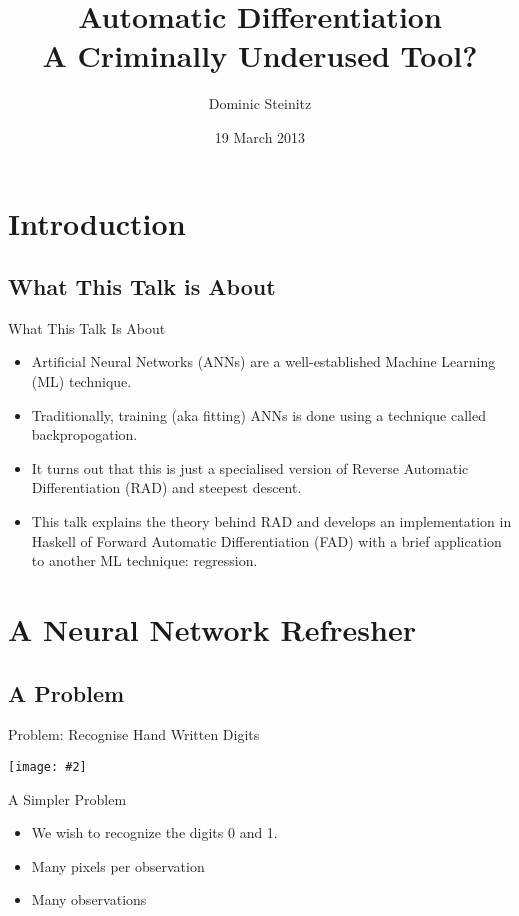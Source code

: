 \documentclass{beamer}
\title[Automatic differentiation]{Automatic Differentiation\\A Criminally Underused Tool?}
\author{Dominic Steinitz}
\institute{Kingston University}
\date{19 March 2013}
\newcommand {\framedgraphic}[2] {
    \begin{frame}{#1}
        \begin{center}
            \texttt{[image: \#2]}
        \end{center}
    \end{frame}
}
\begin{document}
\begin{frame}
\titlepage
\end{frame}

\section{Introduction}

\subsection{What This Talk is About}

\begin{frame}{What This Talk Is About}

  \begin{itemize}
  \item Artificial Neural Networks (ANNs) are a well-established
    Machine Learning (ML) technique.
  \item Traditionally, training (aka fitting) ANNs is done using a
    technique called backpropogation.
  \item It turns out that this is just a specialised version of
    Reverse Automatic Differentiation (RAD) and steepest descent.
  \item This talk explains the theory behind RAD and develops an
    implementation in Haskell of Forward Automatic Differentiation
    (FAD) with a brief application to another ML technique:
    regression.
  \end{itemize}

\end{frame}

\section{A Neural Network Refresher}

\subsection{A Problem}

\framedgraphic{Problem: Recognise Hand Written Digits}{diagrams/mnist_originals.png}

\begin{frame}[fragile]{A Simpler Problem}
\begin{itemize}
\item We wish to recognize the digits 0 and 1.
\item Many pixels per observation
\item Many observations
\end{itemize}
\end{frame}
\end{document}
